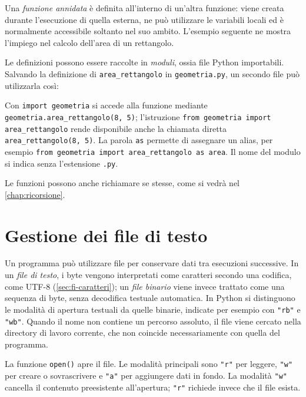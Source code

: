 Una \emph{funzione annidata} è definita all'interno
di un'altra funzione: viene creata durante l'esecuzione di quella
esterna, ne può utilizzare le variabili locali ed è normalmente
accessibile soltanto nel suo ambito. L'esempio seguente ne mostra
l'impiego nel calcolo dell'area di un rettangolo.



Le definizioni possono essere raccolte in \emph{moduli}, ossia file
Python importabili. Salvando la definizione di
\texttt{area\_rettangolo} in \texttt{geometria.py}, un secondo file
può utilizzarla così:



Con \texttt{import geometria} si accede alla funzione mediante
\texttt{geometria.area\_rettangolo(8, 5)};
l'istruzione \lstinline|from geometria import area_rettangolo|
rende disponibile anche la chiamata diretta
\lstinline|area_rettangolo(8, 5)|.
La parola \texttt{as} permette di assegnare un alias, per esempio
\lstinline|from geometria import area_rettangolo as area|.
Il nome del modulo si indica senza l'estensione \texttt{.py}.

Le funzioni possono anche richiamare se stesse, come si vedrà
nel \cref{chap:ricorsione}.

\clearpage

\section{Gestione dei file di testo}
\label{sec:fi-python-file}

Un programma può utilizzare file per conservare dati tra esecuzioni
successive. In un \emph{file di testo}, i byte vengono interpretati come caratteri
secondo una codifica, come UTF-8 (\cref{sec:fi-caratteri}); un
\emph{file binario} viene invece trattato come una sequenza di byte,
senza decodifica testuale automatica. In Python si distinguono le modalità
di apertura testuali da quelle binarie, indicate per esempio con
\lstinline|"rb"| e \lstinline|"wb"|.
Quando il nome non contiene un percorso assoluto, il file viene
cercato nella directory di lavoro corrente,
che non coincide necessariamente con quella del programma.

La funzione \texttt{open()} apre il file. Le modalità principali sono
\lstinline|"r"| per leggere, \lstinline|"w"| per creare o sovrascrivere
e \lstinline|"a"| per aggiungere dati in fondo. La modalità
\lstinline|"w"| cancella il contenuto preesistente all'apertura;
\lstinline|"r"| richiede invece che il file esista.


